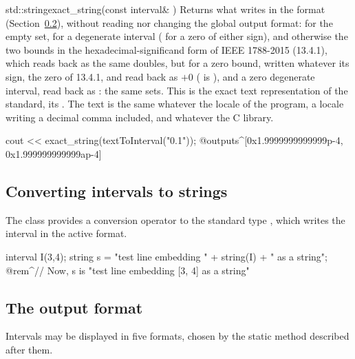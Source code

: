 \begin{deffun}{std::string}{exact\_string}{(const interval\& )}
  Returns what  writes in the format 
  (Section~\ref{sec:output-format}), without reading nor changing the global
  output format:  for the empty set,  for a
  degenerate interval ( for a zero of either sign), and
  otherwise the two bounds in the hexadecimal-significand form of IEEE
  1788-2015 (13.4.1), which  reads back as the same
  doubles, but for a zero bound, written  whatever its sign,
  the zero of 13.4.1, and read back as $+0$ ( is
  ), and a zero degenerate interval, read back as
  : the same sets. This is
  the exact text representation of the standard, its
  .\newinvfive{} The text is the same whatever the
  locale of the program, a locale writing a decimal comma included, and
  whatever the C library.
\begin{example}
cout << exact_string(textToInterval("0.1"));
@outputs^[0x1.9999999999999p-4, 0x1.999999999999ap-4]~
\end{example}
\end{deffun}

\subsection{Converting intervals to strings}

The class  provides a conversion operator to the standard
type , which writes the interval in the active format.
%

\begin{example}
interval I(3,4);
string s = "test line embedding " + string(I) + " as a string";
@rem^// Now, s is "test line embedding [3, 4] as a string"~
\end{example}

\subsection{The output format}\label{sec:output-format}

Intervals may be displayed in five formats, chosen by the static method
 described after them.
%
%

